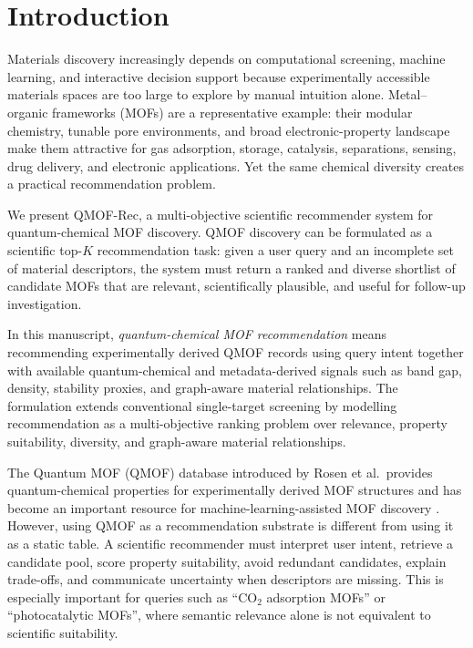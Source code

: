 \documentclass[12pt,a4paper]{article}
\begin{document}
\section{Introduction}
\label{sec:intro}

Materials discovery increasingly depends on computational screening, machine learning, and interactive decision support because experimentally accessible materials spaces are too large to explore by manual intuition alone. Metal--organic frameworks (MOFs) are a representative example: their modular chemistry, tunable pore environments, and broad electronic-property landscape make them attractive for gas adsorption, storage, catalysis, separations, sensing, drug delivery, and electronic applications. Yet the same chemical diversity creates a practical recommendation problem.

We present QMOF-Rec, a multi-objective scientific recommender system for quantum-chemical MOF discovery. QMOF discovery can be formulated as a scientific top-$K$ recommendation task: given a user query and an incomplete set of material descriptors, the system must return a ranked and diverse shortlist of candidate MOFs that are relevant, scientifically plausible, and useful for follow-up investigation.

In this manuscript, \emph{quantum-chemical MOF recommendation} means recommending experimentally derived QMOF records using query intent together with available quantum-chemical and metadata-derived signals such as band gap, density, stability proxies, and graph-aware material relationships. The formulation extends conventional single-target screening by modelling recommendation as a multi-objective ranking problem over relevance, property suitability, diversity, and graph-aware material relationships.

The Quantum MOF (QMOF) database introduced by Rosen et al.\ provides quantum-chemical properties for experimentally derived MOF structures and has become an important resource for machine-learning-assisted MOF discovery \cite{rosen2021,rosen2022}. However, using QMOF as a recommendation substrate is different from using it as a static table. A scientific recommender must interpret user intent, retrieve a candidate pool, score property suitability, avoid redundant candidates, explain trade-offs, and communicate uncertainty when descriptors are missing. This is especially important for queries such as ``CO$_2$ adsorption MOFs'' or ``photocatalytic MOFs'', where semantic relevance alone is not equivalent to scientific suitability.
\end{document}
